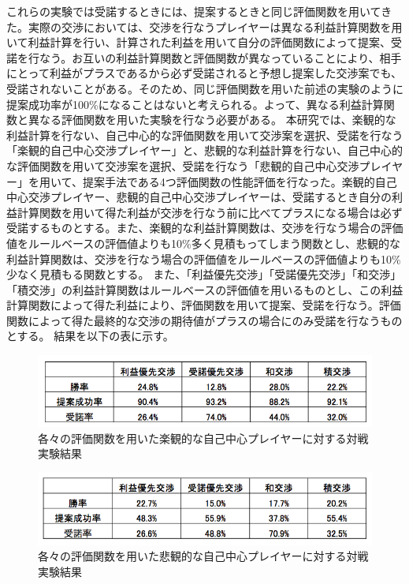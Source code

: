 \documentclass[a4, 10pt,dvipdfmx]{jsarticle}
\begin{document}
これらの実験では受諾するときには、提案するときと同じ評価関数を用いてきた。実際の交渉においては、交渉を行なうプレイヤーは異なる利益計算関数を用いて利益計算を行い、計算された利益を用いて自分の評価関数によって提案、受諾を行なう。お互いの利益計算関数と評価関数が異なっていることにより、相手にとって利益がプラスであるから必ず受諾されると予想し提案した交渉案でも、受諾されないことがある。そのため、同じ評価関数を用いた前述の実験のように提案成功率が100\%になることはないと考えられる。よって、異なる利益計算関数と異なる評価関数を用いた実験を行なう必要がある。
本研究では、楽観的な利益計算を行ない、自己中心的な評価関数を用いて交渉案を選択、受諾を行なう「楽観的自己中心交渉プレイヤー」と、悲観的な利益計算を行ない、自己中心的な評価関数を用いて交渉案を選択、受諾を行なう「悲観的自己中心交渉プレイヤー」を用いて、提案手法である4つ評価関数の性能評価を行なった。楽観的自己中心交渉プレイヤー、悲観的自己中心交渉プレイヤーは、受諾するとき自分の利益計算関数を用いて得た利益が交渉を行なう前に比べてプラスになる場合は必ず受諾するものとする。また、楽観的な利益計算関数は、交渉を行なう場合の評価値をルールベースの評価値よりも10\%多く見積もってしまう関数とし、悲観的な利益計算関数は、交渉を行なう場合の評価値をルールベースの評価値よりも10\%少なく見積もる関数とする。
また、「利益優先交渉」「受諾優先交渉」「和交渉」「積交渉」の利益計算関数はルールベースの評価値を用いるものとし、この利益計算関数によって得た利益により、評価関数を用いて提案、受諾を行なう。評価関数によって得た最終的な交渉の期待値がプラスの場合にのみ受諾を行なうものとする。
結果を以下の表に示す。

\begin{figure}[t]
    \begin{center}
      \includegraphics[width=120mm]{img/eva_positive.png}
    \end{center}
    \caption{各々の評価関数を用いた楽観的な自己中心プレイヤーに対する対戦実験結果}
    \label{player_positive}
\end{figure}


\begin{figure}[t]
    \begin{center}
      \includegraphics[width=120mm]{img/eva_negative.png}
    \end{center}
    \caption{各々の評価関数を用いた悲観的な自己中心プレイヤーに対する対戦実験結果}
    \label{player_negative}
\end{figure}
\end{document}
